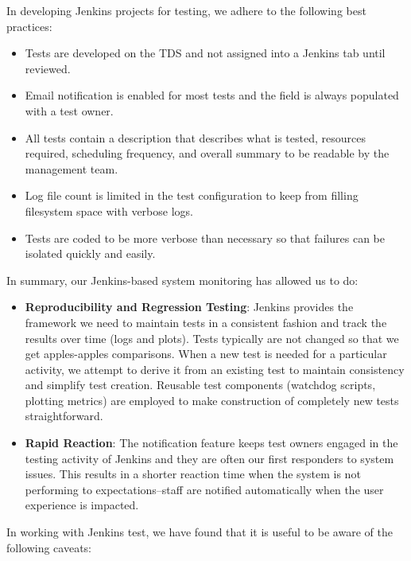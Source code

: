 \documentclass[10pt, conference, compsocconf]{IEEEtran}
\begin{document}
In developing Jenkins projects for testing, we adhere to the following best practices: 
\begin{itemize}
\item Tests are developed on the TDS and not assigned into a Jenkins tab until reviewed. 
\item Email notification is enabled for most tests and the field is always populated with a test owner.
\item All tests contain a description that describes what is tested, resources required, scheduling frequency, and overall summary  to be readable by the management team.
\item Log file count is limited in the test configuration to keep from filling filesystem space with verbose logs.
\item Tests are coded to be more verbose than necessary so that failures can be isolated quickly and easily.
\end{itemize}

In summary, our Jenkins-based system monitoring has allowed us to do: 

\begin{itemize}
 
\item \textbf{Reproducibility and Regression Testing}: Jenkins provides the framework we need to maintain tests in a consistent fashion and track the results over time (logs and plots). 
Tests typically are not changed so that we get apples-apples comparisons.
When a new test is needed for a particular activity, we attempt to derive it from an existing test to maintain consistency and simplify test creation.
Reusable test components (watchdog scripts, plotting metrics) are employed to make construction of completely new tests straightforward.

\item \textbf{Rapid Reaction}:
The notification feature keeps test owners engaged in the testing activity of Jenkins and they are often our first responders to system issues.  This results in a shorter reaction time when the system is not performing to expectations--staff are notified automatically when the user experience is impacted.

\end{itemize}

In working with Jenkins test, we have found that it is useful to be aware of the following caveats: 
\end{document}
